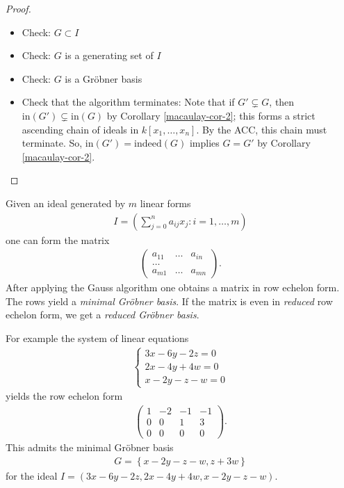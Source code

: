 \documentclass[a4paper, 11pt]{article}
\begin{document}
\begin{proof}
  \begin{itemize}
    \item Check: \( G \subset I\)
    \item Check: \( G \) is a generating set of \( I \)
    \item Check: \( G \) is a Gröbner basis
    \item Check that the algorithm terminates: Note that if \( G' \subsetneq G \), then \( \mathrm{in}(G') \subsetneq \mathrm{in}(G) \) by Corollary \ref{macaulay-cor-2}; this forms a strict ascending chain of ideals in \( k[x_1, \dots, x_n] \). By the ACC, this chain must terminate. So, \( \mathrm{in}(G') = \mathrm{indeed}(G) \) implies \( G = G' \) by Corollary \ref{macaulay-cor-2}.
  \end{itemize}
\end{proof}

\begin{eg}
  Given an ideal generated by \( m \) linear forms 
  \begin{align*}
    I = ( \sum_{j=0}^n a_{ij} x_j : i = 1,\dots,m )
  \end{align*}
  one can form the matrix 
  \begin{align*}
    \begin{pmatrix}
      a_{11} & \dots & a_{in} \\
      \dots \\
      a_{m1} & \dots & a_{mn}
    \end{pmatrix}.
  \end{align*}
  After applying the Gauss algorithm one obtains a matrix in row echelon form. The rows yield a \emph{minimal Gröbner basis}. If the matrix is even in \emph{reduced} row echelon form, we get a \emph{reduced Gröbner basis}.

  For example the system of linear equations 
  \begin{align*}
    \begin{cases}
      3x - 6y - 2z = 0 \\
      2x - 4y + 4w = 0 \\
      x - 2y - z - w = 0
    \end{cases}
  \end{align*}
  yields the row echelon form 
  \begin{align*}
    \begin{pmatrix}
      1 & -2 & -1 & -1 \\
      0 & 0 & 1 & 3 \\
      0 & 0 & 0 & 0
    \end{pmatrix}.
  \end{align*}
  This admits the minimal Gröbner basis 
  \begin{align*}
    G = \left\{ x - 2y - z - w, z + 3w \right\}
  \end{align*}
  for the ideal \( I = (3x - 6y - 2z, 2x - 4y + 4w, x - 2y - z - w) \).
\end{eg}
\end{document}
